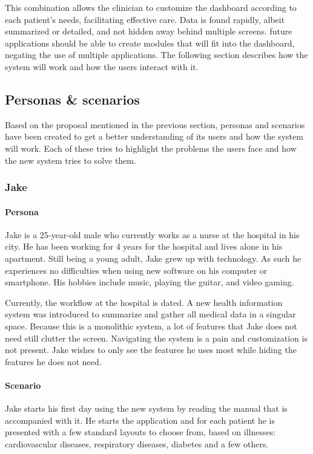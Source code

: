    This combination allows the clinician to customize the dashboard according to each patient's needs, facilitating effective care. Data is found rapidly, albeit summarized or detailed, and not hidden away behind multiple screens. future applications should be able to create modules that will fit into the dashboard, negating the use of multiple applications. The following section describes how the system will work and how the users interact with it.

    \subsection{Personas \& scenarios}

    Based on the proposal mentioned in the previous section, personas and scenarios have been created to get a better understanding of its users and how the system will work. Each of these tries to highlight the problems the users face and how the new system tries to solve them.

        \subsubsection{Jake}

        \paragraph{Persona} Jake is a 25-year-old male who currently works as a nurse at the hospital in his city. He has been working for 4 years for the hospital and lives alone in his apartment. Still being a young adult, Jake grew up with technology. As such he experiences no difficulties when using new software on his computer or smartphone. His hobbies include music, playing the guitar, and video gaming.

        Currently, the workflow at the hospital is dated. A new health information system was introduced to summarize and gather all medical data in a singular space. Because this is a monolithic system, a lot of features that Jake does not need still clutter the screen. Navigating the system is a pain and customization is not present. Jake wishes to only see the features he uses most while hiding the features he does not need.
        
        \paragraph{Scenario} Jake starts his first day using the new system by reading the manual that is accompanied with it. He starts the application and for each patient he is presented with a few standard layouts to choose from, based on illnesses: cardiovascular diseases, respiratory diseases, diabetes and a few others.

